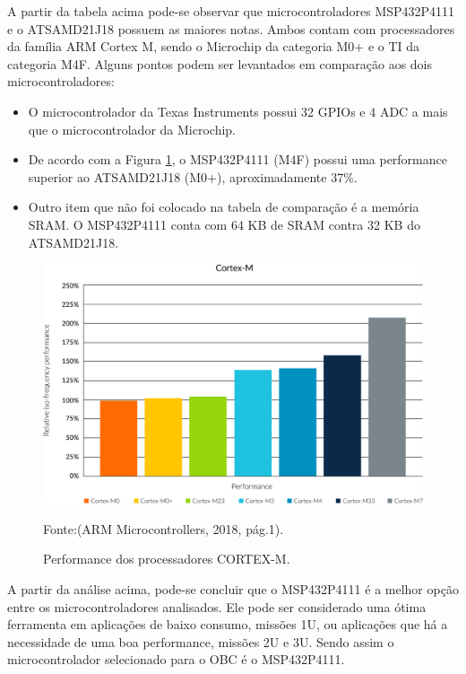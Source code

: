 A partir da tabela acima pode-se observar que microcontroladores MSP432P4111 e o ATSAMD21J18 possuem as maiores notas. Ambos contam com processadores da família ARM Cortex M, sendo o Microchip da categoria M0+ e o TI da categoria M4F. Alguns pontos podem ser levantados em comparação aos dois microcontroladores:

\begin{itemize}
	\item O microcontrolador da Texas Instruments possui 32 GPIOs e 4 ADC a mais que o microcontrolador da Microchip.
	
	\item De acordo com a Figura \ref{fig18}, o MSP432P4111 (M4F) possui uma performance superior ao ATSAMD21J18 (M0+), aproximadamente 37\%.
	
	\item Outro item que não foi colocado na tabela de comparação é a memória SRAM. O MSP432P4111 conta com 64 KB de SRAM contra 32 KB do ATSAMD21J18.
	
\end{itemize}


\begin{figure}[h]
	
	\centering
	\caption{ Performance dos processadores CORTEX-M.}
	\includegraphics[keepaspectratio=true,scale=0.4]{figuras/arm-cortex-m-series-performance-graph.jpg}
	
	Fonte:(ARM Microcontrollers, 2018, pág.1).
	
	\label{fig18}
\end{figure}
\FloatBarrier

A partir da análise acima, pode-se concluir que o MSP432P4111 é a melhor opção entre os microcontroladores analisados. Ele pode ser considerado uma ótima ferramenta em aplicações de baixo consumo, missões 1U, ou aplicações que há a necessidade de uma boa performance, missões 2U e 3U. Sendo assim o microcontrolador selecionado para o OBC é o MSP432P4111.

